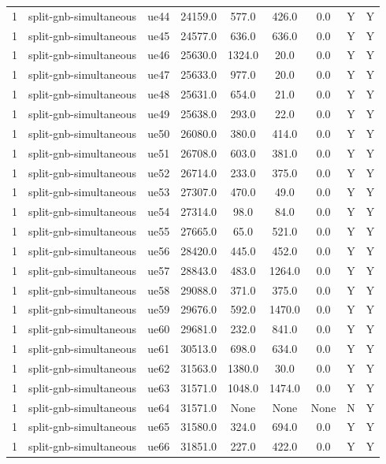\begin{table}[ht]
\begin{tabular}{|c|c|c|c|c|c|c|c|c|}
1 & split-gnb-simultaneous & ue44 & 24159.0 & 577.0 & 426.0 & 0.0 & Y & Y \\
1 & split-gnb-simultaneous & ue45 & 24577.0 & 636.0 & 636.0 & 0.0 & Y & Y \\
1 & split-gnb-simultaneous & ue46 & 25630.0 & 1324.0 & 20.0 & 0.0 & Y & Y \\
1 & split-gnb-simultaneous & ue47 & 25633.0 & 977.0 & 20.0 & 0.0 & Y & Y \\
1 & split-gnb-simultaneous & ue48 & 25631.0 & 654.0 & 21.0 & 0.0 & Y & Y \\
1 & split-gnb-simultaneous & ue49 & 25638.0 & 293.0 & 22.0 & 0.0 & Y & Y \\
1 & split-gnb-simultaneous & ue50 & 26080.0 & 380.0 & 414.0 & 0.0 & Y & Y \\
1 & split-gnb-simultaneous & ue51 & 26708.0 & 603.0 & 381.0 & 0.0 & Y & Y \\
1 & split-gnb-simultaneous & ue52 & 26714.0 & 233.0 & 375.0 & 0.0 & Y & Y \\
1 & split-gnb-simultaneous & ue53 & 27307.0 & 470.0 & 49.0 & 0.0 & Y & Y \\
1 & split-gnb-simultaneous & ue54 & 27314.0 & 98.0 & 84.0 & 0.0 & Y & Y \\
1 & split-gnb-simultaneous & ue55 & 27665.0 & 65.0 & 521.0 & 0.0 & Y & Y \\
1 & split-gnb-simultaneous & ue56 & 28420.0 & 445.0 & 452.0 & 0.0 & Y & Y \\
1 & split-gnb-simultaneous & ue57 & 28843.0 & 483.0 & 1264.0 & 0.0 & Y & Y \\
1 & split-gnb-simultaneous & ue58 & 29088.0 & 371.0 & 375.0 & 0.0 & Y & Y \\
1 & split-gnb-simultaneous & ue59 & 29676.0 & 592.0 & 1470.0 & 0.0 & Y & Y \\
1 & split-gnb-simultaneous & ue60 & 29681.0 & 232.0 & 841.0 & 0.0 & Y & Y \\
1 & split-gnb-simultaneous & ue61 & 30513.0 & 698.0 & 634.0 & 0.0 & Y & Y \\
1 & split-gnb-simultaneous & ue62 & 31563.0 & 1380.0 & 30.0 & 0.0 & Y & Y \\
1 & split-gnb-simultaneous & ue63 & 31571.0 & 1048.0 & 1474.0 & 0.0 & Y & Y \\
1 & split-gnb-simultaneous & ue64 & 31571.0 & None & None & None & N & Y \\
1 & split-gnb-simultaneous & ue65 & 31580.0 & 324.0 & 694.0 & 0.0 & Y & Y \\
1 & split-gnb-simultaneous & ue66 & 31851.0 & 227.0 & 422.0 & 0.0 & Y & Y \\

\end{tabular}
\end{table}
